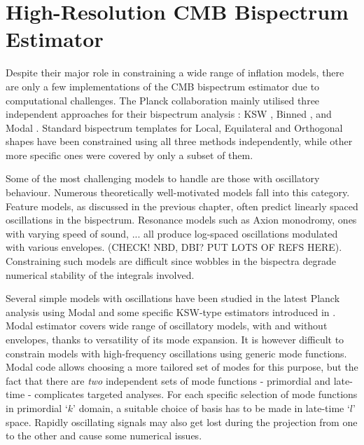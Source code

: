 \chapter{High-Resolution CMB Bispectrum Estimator}

\ifpdf
    \graphicspath{{Chapter5/Figs/Raster}{Chapter5/Figs/PDF}{Chapter5/Figs}}
\else
    \graphicspath{{Chapter5/Figs/Vector}{Chapter5/Figs}}
\fi


Despite their major role in constraining a wide range of inflation models, there are only a few implementations of the CMB bispectrum estimator due to computational challenges. The Planck collaboration mainly utilised three independent approaches for their bispectrum analysis \cite{PlanckCollaboration2015,PlanckCollaboration2018}: KSW \cite{Komatsu2005}, Binned \cite{Bucher2010}, and Modal \cite{Fergusson2012}. Standard bispectrum templates for Local, Equilateral and Orthogonal shapes have been constrained using all three methods independently, while other more specific ones were covered by only a subset of them.

Some of the most challenging models to handle are those with oscillatory behaviour. Numerous theoretically well-motivated models fall into this category. Feature models, as discussed in the previous chapter, often predict linearly spaced oscillations in the bispectrum. Resonance models such as Axion monodromy, ones with varying speed of sound, ... all produce log-spaced oscillations modulated with various envelopes. (CHECK! NBD, DBI? PUT LOTS OF REFS HERE). Constraining such models are difficult since wobbles in the bispectra degrade numerical stability of the integrals involved.

Several simple models with oscillations have been studied in the latest Planck analysis using Modal and some specific KSW-type estimators introduced in \cite{Munchmeyer2014}. Modal estimator covers wide range of oscillatory models, with and without envelopes, thanks to versatility of its mode expansion. It is however difficult to constrain models with high-frequency oscillations using generic mode functions. Modal code allows choosing a more tailored set of modes for this purpose, but the fact that there are \textit{two} independent sets of mode functions - primordial and late-time - complicates targeted analyses. For each specific selection of mode functions in primordial `$k$' domain, a suitable choice of basis has to be made in late-time `$l$' space. Rapidly oscillating signals may also get lost during the projection from one to the other and cause some numerical issues.

